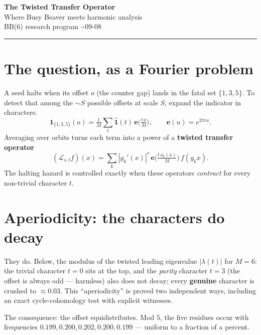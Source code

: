 \documentclass[11pt]{article}
\newcommand{\lead}[1]{{\color{acc}\textbf{#1}}}
\begin{document}
\begin{center}{\LARGE\bfseries\color{ink} The Twisted Transfer Operator}\\[3pt]
{\large\color{acc} Where Busy Beaver meets harmonic analysis}\\[2pt]{\small BB(6) research program \quad$\cdot$-09-08}\end{center}
\vspace{4pt}\hrule\vspace{8pt}

\section{The question, as a Fourier problem}
A seed halts when its offset $o$ (the counter gap) lands in the fatal set $\{1,3,5\}$. To detect that among the $\sim S$ possible offsets at scale $S$, expand the indicator in characters:
\[ \mathbf 1_{\{1,3,5\}}(o)=\tfrac1M\sum_{t}\widehat{\mathbf 1}(t)\,\mathbf e\!\big(\tfrac{t\,o}{M}\big),\qquad \mathbf e(u)=e^{2\pi i u}. \]
Averaging over orbits turns each term into a power of a \lead{twisted transfer operator}
\[ (\mathcal L_{s,t}f)(x)=\sum_k |g_k'(x)|^{s}\,\mathbf e\!\big(\tfrac{t\,o_k(x)}{M}\big)\,f(g_kx). \]
The halting hazard is controlled exactly when these operators \emph{contract} for every non-trivial character $t$.

\section{Aperiodicity: the characters do decay}
They do. Below, the modulus of the twisted leading eigenvalue $|\lambda(t)|$ for $M=6$: the trivial character $t=0$ sits at the top, and the \emph{parity} character $t=3$ (the offset is always odd --- harmless) also does not decay; every \lead{genuine} character is crushed to $\approx0.03$. This ``aperiodicity'' is proved two independent ways, including an exact cycle-cohomology test with explicit witnesses.

\begin{center}\end{center}
\noindent The consequence: the offset equidistributes. Mod $5$, the five residues occur with frequencies $0.199, 0.200, 0.202, 0.200, 0.199$ --- uniform to a fraction of a percent.
\end{document}
